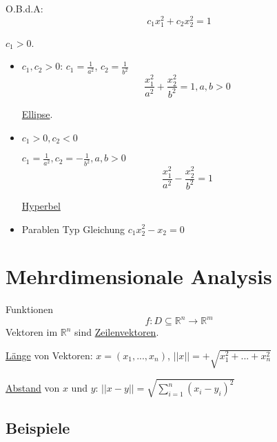 \documentclass[a4paper, openany]{book}
\begin{document}
\begin{enumerate}[label=(\alph*)]
          O.B.d.A: \[ c_1x_1^2  + c_2x_2^2 = 1 \]

          $c_1 > 0$.

          \par \medskip

          \begin{itemize}
            \item $c_1, c_2 > 0$:  $c_1 = \frac{1}{a^2}$, $c_2 = \frac{1}{b^2}$ \[ \frac{x_1^2}{a^2} + \frac{x_2^2}{b^2} = 1, a,b > 0 \]

           \underline{Ellipse}.

           \item $c_1 > 0, c_2 < 0$

           $c_1 = \frac{1}{a^2}, c_2 = - \frac{1}{b^2}, a,b > 0$ \[ \frac{x_1^2}{a^2} - \frac{x_2^2}{b^2} = 1 \]

           \underline{Hyperbel}

           \item Parablen Typ Gleichung $c_1x_2^2 - x_2 = 0$

          \end{itemize}


        \end{enumerate}

        \chapter{Mehrdimensionale Analysis}

        Funktionen \[f: D \subseteq \mathbb{R}^n \rightarrow \mathbb{R}^m \] Vektoren im $\mathbb{R}^n$ sind \underline{Zeilenvektoren}. 

        \par \medskip

        \underline{Länge} von Vektoren: $x = (x_1, ..., x_n)$, $||x|| = + \sqrt{x_1^2 + ... + x_n^2}$

        \par \medskip

        \underline{Abstand} von $x$ und $y$: $||x-y|| = \sqrt{\sum_{i=1}^n (x_i - y_i)^2}$

        \section{Beispiele}
\end{document}
